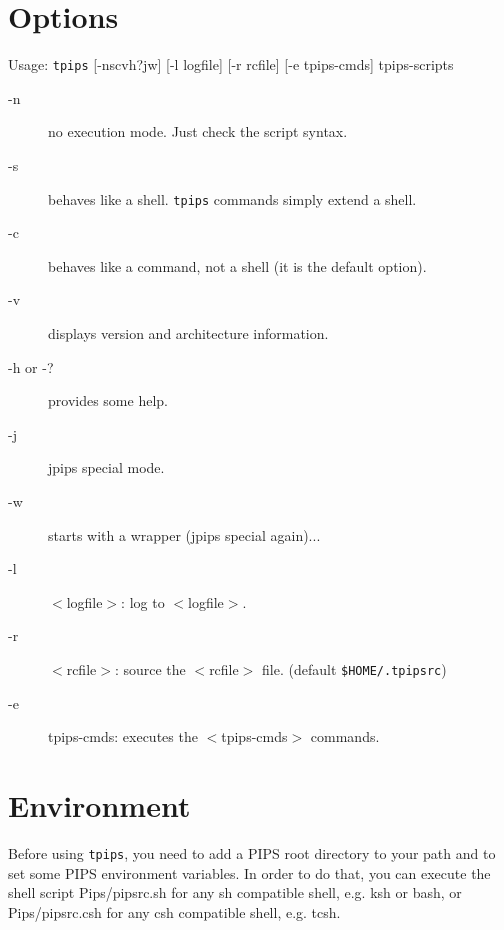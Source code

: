 \documentclass[a4paper,12pt]{article}
\begin{document}
\section{Options}
Usage: {\tt tpips} [-nscvh?jw] [-l logfile] [-r rcfile] [-e tpips-cmds] tpips-scripts
\begin{description}

\item [-n]  no execution mode. Just check the script syntax.
\item [-s] behaves like a shell. {\tt tpips} commands simply extend a shell.
\item [-c] behaves like a command, not a shell (it is the default option).
\item [-v] displays version and architecture information.
\item [-h or -?] provides some help.
\item [-j] jpips special mode.
\item [-w] starts with a wrapper (jpips special again)...
\item [-l] $<$logfile$>$: log to $<$logfile$>$.
\item [-r] $<$rcfile$>$: source the $<$rcfile$>$ file. 
  (default \verb|$HOME/.tpipsrc|) %
\item [-e] tpips-cmds: executes the $<$tpips-cmds$>$ commands.
\end{description}


\section{Environment}


Before using {\tt tpips}, you need to add a PIPS root directory to
your path and to set some PIPS environment variables. In
order to do that, you can execute the shell script
Pips/pipsrc.sh for any sh compatible shell, e.g. ksh or
bash, or Pips/pipsrc.csh for any csh compatible shell, e.g.
tcsh.
\end{document}
